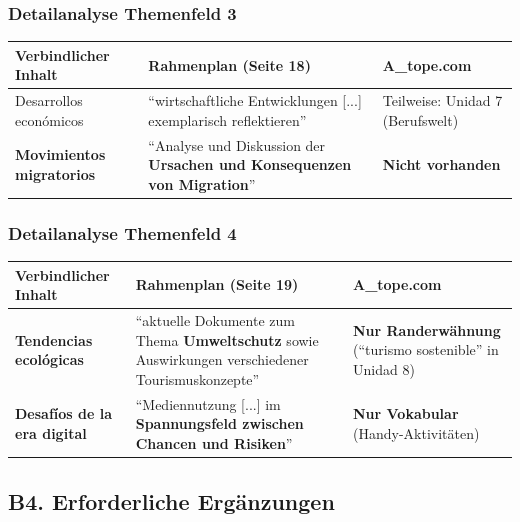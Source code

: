 \documentclass[10pt,a4paper]{article}
\begin{document}
\subsubsection{Detailanalyse Themenfeld 3}

\begin{center}
\small
\begin{tabular}{|p{4cm}|p{5cm}|p{4cm}|}
\hline
\rowcolor{lightgray}
\textbf{Verbindlicher Inhalt} & \textbf{Rahmenplan (Seite 18)} & \textbf{A\_tope.com} \\
\hline
Desarrollos económicos & ``wirtschaftliche Entwicklungen [...] exemplarisch reflektieren'' & Teilweise: Unidad 7 (Berufswelt) \\
\hline
\rowcolor{lightred}
\textbf{Movimientos migratorios} & ``Analyse und Diskussion der \textbf{Ursachen und Konsequenzen von Migration}'' & \textcolor{spanisch}{\textbf{Nicht vorhanden}} \\
\hline
\end{tabular}
\end{center}

\subsubsection{Detailanalyse Themenfeld 4}

\begin{center}
\small
\begin{tabular}{|p{4cm}|p{5cm}|p{4cm}|}
\hline
\rowcolor{lightgray}
\textbf{Verbindlicher Inhalt} & \textbf{Rahmenplan (Seite 19)} & \textbf{A\_tope.com} \\
\hline
\rowcolor{lightred}
\textbf{Tendencias ecológicas} & ``aktuelle Dokumente zum Thema \textbf{Umweltschutz} sowie Auswirkungen verschiedener Tourismuskonzepte'' & \textcolor{spanisch}{\textbf{Nur Randerwähnung}} (``turismo sostenible'' in Unidad 8) \\
\hline
\rowcolor{lightred}
\textbf{Desafíos de la era digital} & ``Mediennutzung [...] im \textbf{Spannungsfeld zwischen Chancen und Risiken}'' & \textcolor{spanisch}{\textbf{Nur Vokabular}} (Handy-Aktivitäten) \\
\hline
\end{tabular}
\end{center}

\subsection{B4. Erforderliche Ergänzungen}
\end{document}

